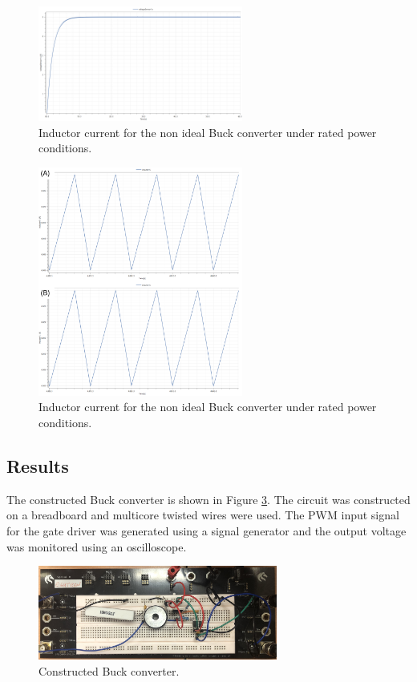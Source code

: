 \documentclass[12pt,twoside]{scrartcl}
\begin{document}
\begin{figure}[htp]
    \centering
    \includegraphics[width=0.6\textwidth]{buck_NI_output_newD.png}
    \caption{Inductor current for the non ideal Buck converter under rated power conditions.}
    \label{fig:buck_Current}
\end{figure}

\begin{figure}[htp]
    \centering
    \includegraphics[width=0.6\textwidth]{buck_NIDCM}
    \caption{Inductor current for the non ideal Buck converter under rated power conditions.}
    \label{fig:buck_NIDCM}
\end{figure}

\subsection{Results}
The constructed Buck converter is shown in Figure \ref{fig:buck_real}. The circuit was constructed on a breadboard and multicore twisted wires were used. The PWM input signal for the gate driver was generated using a signal generator and the output voltage was monitored using an oscilloscope. \par

\begin{figure}[htp]
    \centering
    \includegraphics[width=0.7\textwidth]{buck_real}
    \caption{Constructed Buck converter.}
    \label{fig:buck_real}
\end{figure}
\end{document}
